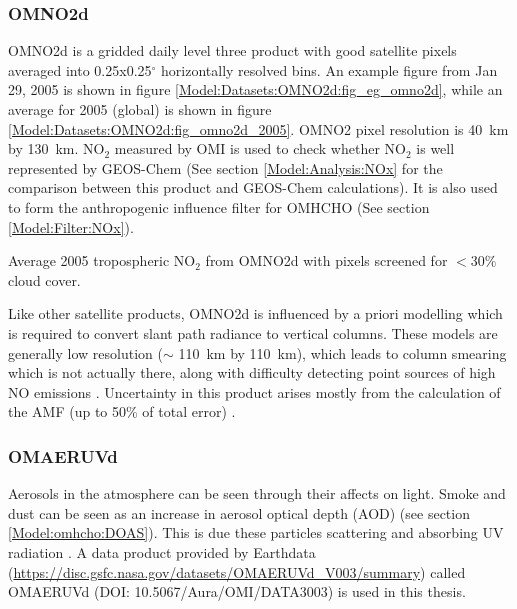     \subsubsection{OMNO2d}
      \label{Model:Datasets:OMNO2d}
      OMNO2d is a gridded daily level three product with good satellite pixels averaged into 0.25x0.25$^{\circ}$ horizontally resolved bins.
      An example figure from Jan 29, 2005 is shown in figure \ref{Model:Datasets:OMNO2d:fig_eg_omno2d}, while an average for 2005 (global) is shown in figure \ref{Model:Datasets:OMNO2d:fig_omno2d_2005}.
      OMNO2 pixel resolution is 40~km by 130~km.
      NO$_2$ measured by OMI is used to check whether NO$_2$ is well represented by GEOS-Chem (See section \ref{Model:Analysis:NOx} for the comparison between this product and GEOS-Chem calculations).
      It is also used to form the anthropogenic influence filter for OMHCHO (See section \ref{Model:Filter:NOx}).
      
      
      
      {Average 2005 tropospheric NO$_2$ from OMNO2d with pixels screened for $<30\%$ cloud cover.}
      {\label{Model:Datasets:OMNO2d:fig_omno2d_2005}}
      
      Like other satellite products, OMNO2d is influenced by a priori modelling which is required to convert slant path radiance to vertical columns.
      These models are generally low resolution ($\sim$ 110~km by 110~km), which leads to column smearing which is not actually there, along with difficulty detecting point sources of high NO emissions \parencite{Goldberg2018}.
      Uncertainty in this product arises mostly from the calculation of the AMF (up to 50\% of total error) \parencite{Lorente2017}.
    
    \subsubsection{OMAERUVd}
      \label{Model:Datasets:OMAERUVd}
      
      Aerosols in the atmosphere can be seen through their affects on light. 
      Smoke and dust can be seen as an increase in aerosol optical depth (AOD) (see section \ref{Model:omhcho:DOAS}).
      This is due these particles scattering and absorbing UV radiation \parencite{Ahn2008}.
      A data product provided by Earthdata (\url{https://disc.gsfc.nasa.gov/datasets/OMAERUVd_V003/summary}) called OMAERUVd (DOI: 10.5067/Aura/OMI/DATA3003) is used in this thesis. 
      
